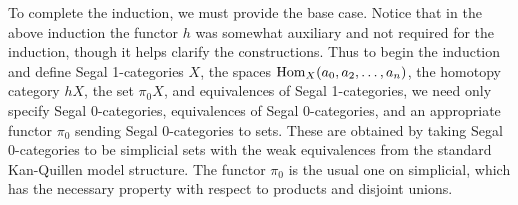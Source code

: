 \documentclass{amsart}
\begin{document}
To complete the induction, we must provide the base case. Notice that in the above induction the functor $\mathit{h}$ was somewhat auxiliary and not required for the induction, though it helps clarify the constructions. Thus to begin the induction and define Segal 1-categories $X$, the spaces $\operatorname{Hom}_X(a_0, a_2, \dots, a_n)$, the homotopy category $\mathit{h}X$, the set $\pi_0X$, and equivalences of Segal 1-categories, we need only specify Segal $0$-categories, equivalences of Segal $0$-categories, and an appropriate functor $\pi_0$ sending Segal $0$-categories to sets. These are obtained by taking Segal $0$-categories to be simplicial sets with the weak equivalences from the standard Kan-Quillen model structure. The functor $\pi_0$ is the usual one on simplicial, which has the necessary property with respect to products and disjoint unions. 

\end{document}
